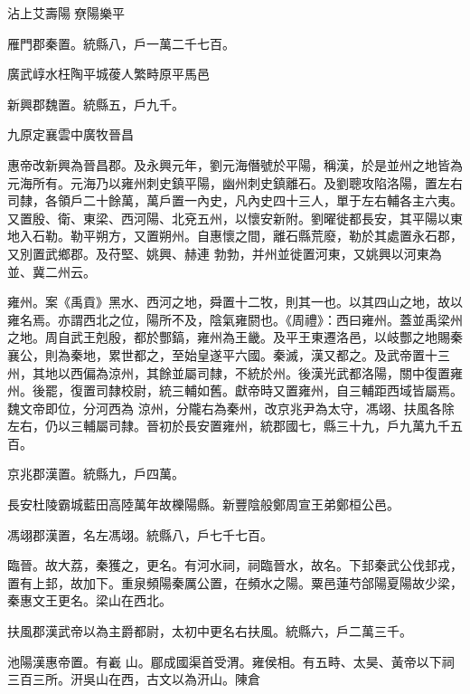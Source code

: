 \begin{pinyinscope}
 沾上艾壽陽尞陽樂平



 雁門郡秦置。統縣八，戶一萬二千七百。



 廣武崞水枉陶平城葰人繁畤原平馬邑



 新興郡魏置。統縣五，戶九千。



 九原定襄雲中廣牧晉昌



 惠帝改新興為晉昌郡。及永興元年，劉元海僭號於平陽，稱漢，於是並州之地皆為元海所有。元海乃以雍州刺史鎮平陽，幽州刺史鎮離石。及劉聰攻陷洛陽，置左右司隸，各領戶二十餘萬，萬戶置一內史，凡內史四十三人，單于左右輔各主六夷。又置殷、衛、東梁、西河陽、北兗五州，以懷安新附。劉曜徙都長安，其平陽以東地入石勒。勒平朔方，又置朔州。自惠懷之間，離石縣荒廢，勒於其處置永石郡，又別置武鄉郡。及苻堅、姚興、赫連
 勃勃，并州並徙置河東，又姚興以河東為並、冀二州云。



 雍州。案《禹貢》黑水、西河之地，舜置十二牧，則其一也。以其四山之地，故以雍名焉。亦謂西北之位，陽所不及，陰氣雍閼也。《周禮》：西曰雍州。蓋並禹梁州之地。周自武王剋殷，都於酆鎬，雍州為王畿。及平王東遷洛邑，以岐酆之地賜秦襄公，則為秦地，累世都之，至始皇遂平六國。秦滅，漢又都之。及武帝置十三州，其地以西偏為涼州，其餘並屬司隸，不統於州。後漢光武都洛陽，關中復置雍州。後罷，復置司隸校尉，統三輔如舊。獻帝時又置雍州，自三輔距西域皆屬焉。魏文帝即位，分河西為
 涼州，分隴右為秦州，改京兆尹為太守，馮翊、扶風各除左右，仍以三輔屬司隸。晉初於長安置雍州，統郡國七，縣三十九，戶九萬九千五百。



 京兆郡漢置。統縣九，戶四萬。



 長安杜陵霸城藍田高陸萬年故櫟陽縣。新豐陰般鄭周宣王弟鄭桓公邑。



 馮翊郡漢置，名左馮翊。統縣八，戶七千七百。



 臨晉。故大荔，秦獲之，更名。有河水祠，祠臨晉水，故名。下邽秦武公伐邽戎，置有上邽，故加下。重泉頻陽秦厲公置，在頻水之陽。粟邑蓮芍郃陽夏陽故少梁，秦惠文王更名。梁山在西北。



 扶風郡漢武帝以為主爵都尉，太初中更名右扶風。統縣六，戶二萬三千。


池陽漢惠帝置。有嶻
 山。郿成國渠首受渭。雍侯相。有五畤、太昊、黃帝以下祠三百三所。汧吳山在西，古文以為汧山。陳倉




\end{pinyinscope}
